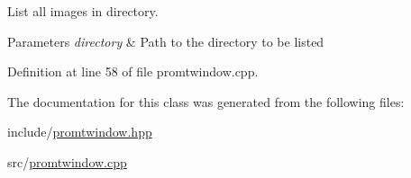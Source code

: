 List all images in directory. 


\begin{DoxyParams}{Parameters}
{\em directory} & Path to the directory to be listed \\
\hline
\end{DoxyParams}


Definition at line 58 of file promtwindow.\+cpp.



The documentation for this class was generated from the following files\+:\begin{DoxyCompactItemize}
\item 
include/\mbox{\hyperlink{promtwindow_8hpp}{promtwindow.\+hpp}}\item 
src/\mbox{\hyperlink{promtwindow_8cpp}{promtwindow.\+cpp}}\end{DoxyCompactItemize}
